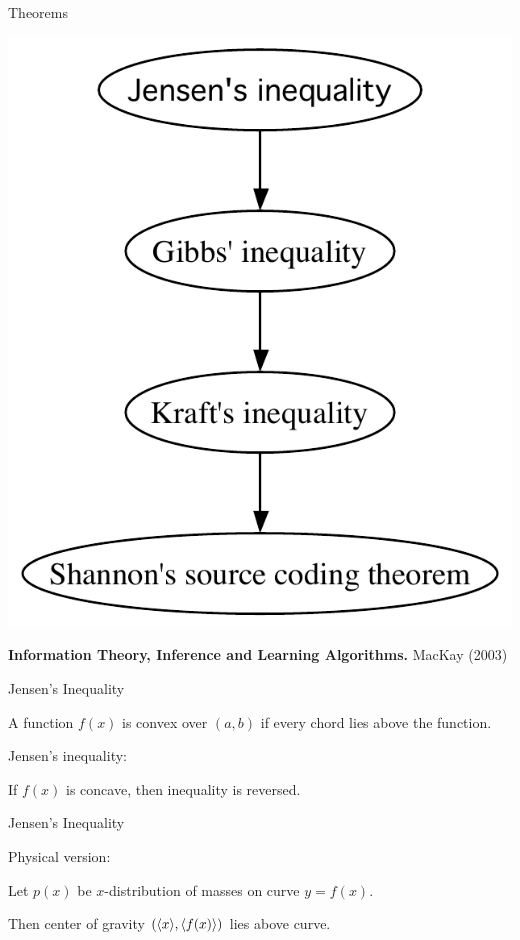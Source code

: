 \documentclass{beamer}
\begin{document}
\begin{frame}{Theorems}

 \centerline{ \includegraphics[height=.75\textheight]{theorems-nodates.pdf} }

{\bf Information Theory, Inference and Learning Algorithms.} MacKay (2003)

\end{frame}

\begin{frame}{Jensen's Inequality}

\itemb
  \item A function $f(x)$ is \alert{convex} over $(a,b)$ if every chord lies above the function.
  \item Jensen's inequality:
\\
\centerline{}
  \item If $f(x)$ is concave, then inequality is reversed.
\iteme

\end{frame}

\begin{frame}{Jensen's Inequality}

\centerline{}

\itemb
  \item Physical version:
   \itemb
    \item Let $p(x)$ be $x$-distribution of masses on curve $y=f(x)$.
    \item Then center of gravity $(\langle x \rangle,\langle f(x) \rangle)$ lies above curve.
   \iteme
\iteme

\end{frame}
\end{document}
